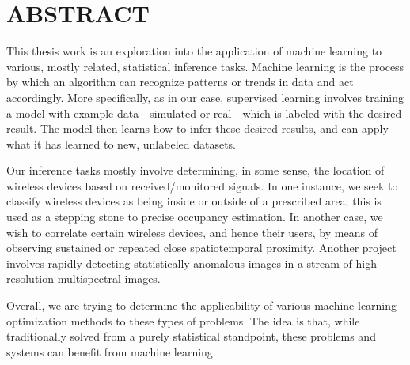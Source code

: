%
%
%

\chapter*{ABSTRACT}

\pagestyle{plain} %
\setcounter{page}{2}

\indent This thesis work is an exploration into the application of machine learning to various, mostly related, statistical inference tasks.
Machine learning is the process by which an algorithm can recognize patterns or trends in data and act accordingly.
More specifically, as in our case, supervised learning involves training a model with example data - simulated or real - which is labeled with the desired result.
The model then learns how to infer these desired results, and can apply what it has learned to new, unlabeled datasets.

Our inference tasks mostly involve determining, in some sense, the location of wireless devices based on received/monitored signals.
In one instance, we seek to classify wireless devices as being inside or outside of a prescribed area; this is used as a stepping stone to precise occupancy estimation.
In another case, we wish to correlate certain wireless devices, and hence their users, by means of observing sustained or repeated close spatiotemporal proximity.
Another project involves rapidly detecting statistically anomalous images in a stream of high resolution multispectral images.

Overall, we are trying to determine the applicability of various machine learning optimization methods to these types of problems.
The idea is that, while traditionally solved from a purely statistical standpoint, these problems and systems can benefit from machine learning.


 

\pagebreak{}
